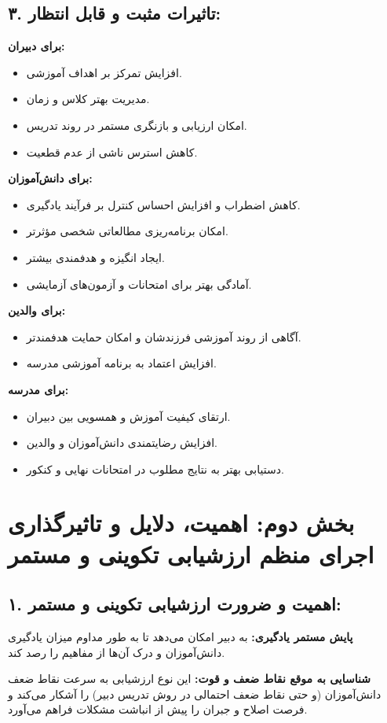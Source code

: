 \documentclass[a4paper]{article}
\begin{document}
\subsection*{۳. تاثیرات مثبت و قابل انتظار:}
\textbf{برای دبیران:}
\begin{itemize}
    \item افزایش تمرکز بر اهداف آموزشی.
    \item مدیریت بهتر کلاس و زمان.
    \item امکان ارزیابی و بازنگری مستمر در روند تدریس.
    \item کاهش استرس ناشی از عدم قطعیت.
\end{itemize}
\textbf{برای دانش‌آموزان:}
\begin{itemize}
    \item کاهش اضطراب و افزایش احساس کنترل بر فرآیند یادگیری.
    \item امکان برنامه‌ریزی مطالعاتی شخصی مؤثرتر.
    \item ایجاد انگیزه و هدفمندی بیشتر.
    \item آمادگی بهتر برای امتحانات و آزمون‌های آزمایشی.
\end{itemize}
\textbf{برای والدین:}
\begin{itemize}
    \item آگاهی از روند آموزشی فرزندشان و امکان حمایت هدفمندتر.
    \item افزایش اعتماد به برنامه آموزشی مدرسه.
\end{itemize}
\textbf{برای مدرسه:}
\begin{itemize}
    \item ارتقای کیفیت آموزش و همسویی بین دبیران.
    \item افزایش رضایتمندی دانش‌آموزان و والدین.
    \item دستیابی بهتر به نتایج مطلوب در امتحانات نهایی و کنکور.
\end{itemize}
\newpage
\section*{بخش دوم: اهمیت، دلایل و تاثیرگذاری اجرای منظم ارزشیابی تکوینی و مستمر}
\bigskip

\subsection*{۱. اهمیت و ضرورت ارزشیابی تکوینی و مستمر:}
\textbf{پایش مستمر یادگیری:} به دبیر امکان می‌دهد تا به طور مداوم میزان یادگیری دانش‌آموزان و درک آن‌ها از مفاهیم را رصد کند.

\textbf{شناسایی به موقع نقاط ضعف و قوت:} این نوع ارزشیابی به سرعت نقاط ضعف دانش‌آموزان (و حتی نقاط ضعف احتمالی در روش تدریس دبیر) را آشکار می‌کند و فرصت اصلاح و جبران را پیش از انباشت مشکلات فراهم می‌آورد.
\end{document}
